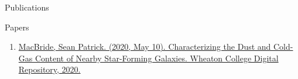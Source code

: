 \documentclass{resume} %
\begin{document}
\begin{rSection}{Publications}
    \begin{rSubsection}{Papers}{}{}{} %
        \begin{enumerate}
            \item \href{https://digitalrepository.wheatoncollege.edu/handle/11040/31192}{MacBride, Sean Patrick. (2020, May 10). Characterizing the Dust and Cold-Gas Content of Nearby Star-Forming Galaxies. Wheaton College Digital Repository, 2020.}
        \end{enumerate}
            
    \end{rSubsection}    
\end{rSection}
\end{document}
